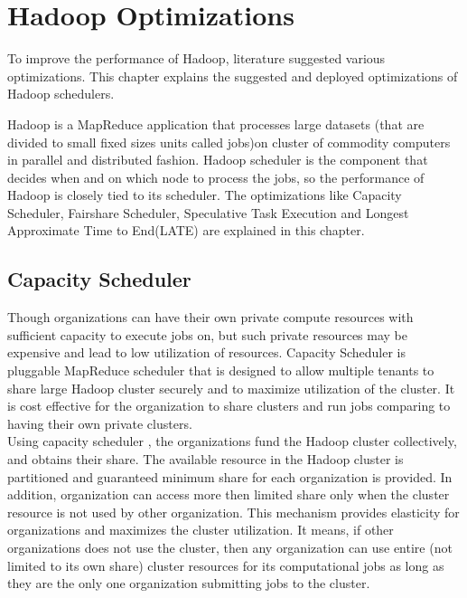 
\chapter{Hadoop Optimizations} %

\label{Chapter3} %


  To improve the performance of Hadoop, literature suggested various optimizations. This chapter explains the suggested and deployed optimizations of Hadoop schedulers. 
  
  Hadoop is a MapReduce application that processes large datasets (that are divided to small fixed sizes units called jobs)on cluster of commodity computers in parallel and distributed fashion. Hadoop scheduler is the component that decides when and on which node to process the jobs, so the performance of Hadoop is closely tied to its scheduler. The optimizations like Capacity Scheduler, Fairshare Scheduler, Speculative Task Execution and Longest Approximate Time to End(LATE) are explained in this chapter. 
   
 
 
 \section{Capacity Scheduler}
 
Though organizations can have their own private compute resources with sufficient capacity to execute jobs on, but such private resources may be expensive and lead to low utilization of resources. Capacity Scheduler is pluggable MapReduce scheduler that is designed to allow multiple tenants to share large Hadoop cluster securely and to maximize utilization of the cluster. It is cost effective for the organization to share clusters and run jobs comparing to having their own private clusters.\\ 

 Using capacity scheduler , the organizations fund the Hadoop cluster collectively, and obtains their share. The available resource in the Hadoop cluster is partitioned and  guaranteed  minimum share for each organization is provided. In addition, organization can access more then limited share only when the cluster resource is not used by other organization. This mechanism provides elasticity for organizations and maximizes the cluster utilization. It means, if other organizations does not use the cluster, then any organization can use entire (not limited to its own share) cluster resources for its computational jobs as long as they are the only one organization submitting jobs to the cluster.\\
 

